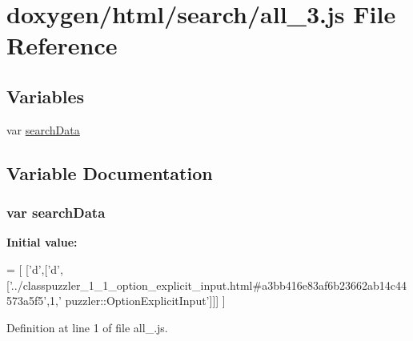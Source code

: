 \hypertarget{a00048}{}\section{doxygen/html/search/all\+\_\+3.js File Reference}
\label{a00048}
\subsection*{Variables}
\begin{DoxyCompactItemize}
\item 
var \hyperlink{a00048_ad01a7523f103d6242ef9b0451861231e}{search\+Data}
\end{DoxyCompactItemize}


\subsection{Variable Documentation}
\hypertarget{a00048_ad01a7523f103d6242ef9b0451861231e}{}
\subsubsection[{search\+Data}]{\setlength{\rightskip}{0pt plus 5cm}var search\+Data}\label{a00048_ad01a7523f103d6242ef9b0451861231e}
{\bfseries Initial value\+:}
\begin{DoxyCode}
=
[
  [\textcolor{charliteral}{'d'},[\textcolor{charliteral}{'d'},[\textcolor{stringliteral}{'../classpuzzler\_1\_1\_option\_explicit\_input.html#a3bb416e83af6b23662ab14c44573a5f5'},1,\textcolor{stringliteral}{'
      puzzler::OptionExplicitInput'}]]]
]
\end{DoxyCode}


Definition at line 1 of file all\+\_.\+js.

